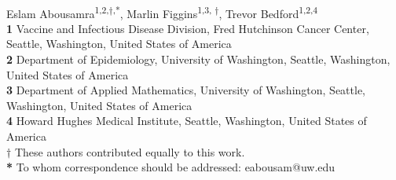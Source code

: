 \documentclass[10pt,letterpaper]{article}
\begin{document}
\vspace*{0.2in}

\begin{flushleft}
{\Large
\textbf{} %
}
\newline
\\
Eslam Abousamra\textsuperscript{1,2,$\dagger$,*},
Marlin Figgins\textsuperscript{1,3, $\dagger$},
Trevor Bedford\textsuperscript{1,2,4}
\\
\bigskip
\textbf{1} Vaccine and Infectious Disease Division, Fred Hutchinson Cancer Center, Seattle, Washington, United States of America
\\
\textbf{2} Department of Epidemiology, University of Washington, Seattle, Washington, United States of America
\\
\textbf{3} Department of Applied Mathematics, University of Washington, Seattle, Washington, United States of America
\\
\textbf{4} Howard Hughes Medical Institute, Seattle, Washington, United States of America
\\
\textbf{$\dagger$} These authors contributed equally to this work.
\\
\textbf{*} To whom correspondence should be addressed: eabousam@uw.edu

\bigskip

%
%






\end{flushleft}
\end{document}

